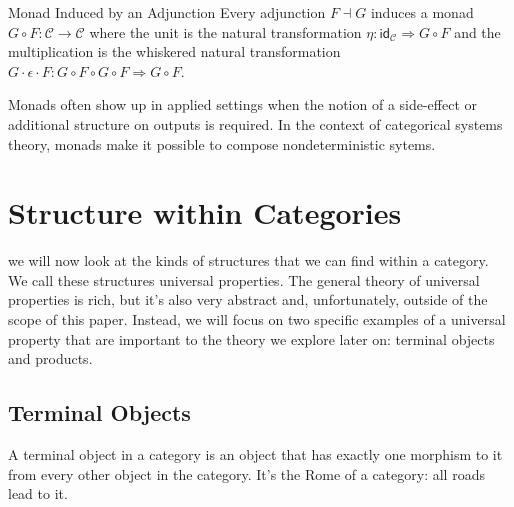 \documentclass[12pt]{article}
\newcounter{examp}
\begin{document}
\begin{definition}{Monad Induced by an Adjunction}{}
    Every adjunction $F \dashv G$ induces a monad $G \circ F: \mathcal{C} \rightarrow \mathcal{C}$ where the unit is the natural transformation $\eta : \mathsf{id}_\mathcal{C} \Rightarrow G \circ F$ and the multiplication is the whiskered natural transformation $G \cdot \epsilon \cdot F: G \circ F \circ G \circ F \Rightarrow G \circ F$.
\end{definition}

Monads often show up in applied settings when the notion of a side-effect or additional structure on outputs is required.
In the context of categorical systems theory, monads make it possible to compose nondeterministic sytems.










\section*{Structure within Categories}

we will now look at the kinds of structures that we can find within a category.
We call these structures universal properties.
The general theory of universal properties is rich, but it's also very abstract and, unfortunately, outside of the scope of this paper.
Instead, we will focus on two specific examples of a universal property that are important to the theory we explore later on: terminal objects and products.

\subsection*{Terminal Objects}
A terminal object in a category is an object that has exactly one morphism to it from every other object in the category.
It's the Rome of a category: all roads lead to it.
\end{document}
